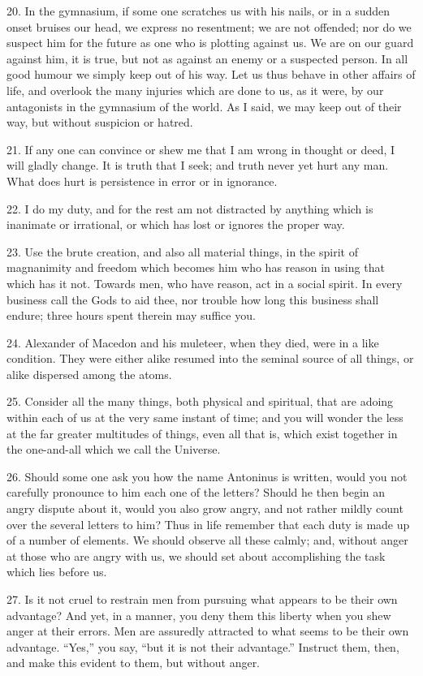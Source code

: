 \documentclass{book}
\begin{document}
20. In the gymnasium, if some one scratches us with his nails, or in a
sudden onset bruises our head, we express no resentment; we are not
offended; nor do we suspect him for the future as one who is plotting
against us. We are on our guard against him, it is true, but not as
against an enemy or a suspected person. In all good humour we simply
keep out of his way. Let us thus behave in other affairs of life, and
overlook the many injuries which are done to us, as it were, by our
antagonists in the gymnasium of the world. As I said, we may keep out
of their way, but without suspicion or hatred.

21. If any one can convince or shew me that I am wrong in thought or
deed, I will gladly change. It is truth that I seek; and truth never
yet hurt any man. What does hurt is persistence in error or in
ignorance.

22. I do my duty, and for the rest am not distracted by anything which
is inanimate or irrational, or which has lost or ignores the proper
way.

23. Use the brute creation, and also all material things, in the
spirit of magnanimity and freedom which becomes him who has reason in
using that which has it not. Towards men, who have reason, act in a
social spirit. In every business call the Gods to aid thee, nor
trouble how long this business shall endure; three hours spent therein
may suffice you.

24. Alexander of Macedon and his muleteer, when they died, were in a
like condition. They were either alike resumed into the seminal source
of all things, or alike dispersed among the atoms.

25. Consider all the many things, both physical and spiritual, that
are adoing within each of us at the very same instant of time; and you
will wonder the less at the far greater multitudes of things, even all
that is, which exist together in the one-and-all which we call the
Universe.

26. Should some one ask you how the name Antoninus is written, would
you not carefully pronounce to him each one of the letters? Should he
then begin an angry dispute about it, would you also grow angry, and
not rather mildly count over the several letters to him? Thus in life
remember that each duty is made up of a number of elements. We should
observe all these calmly; and, without anger at those who are angry
with us, we should set about accomplishing the task which lies before
us.

27. Is it not cruel to restrain men from pursuing what appears to be
their own advantage? And yet, in a manner, you deny them this liberty
when you shew anger at their errors. Men are assuredly attracted to
what seems to be their own advantage. ``Yes,'' you say, ``but it is not
their advantage.'' Instruct them, then, and make this evident to them,
but without anger.
\end{document}
